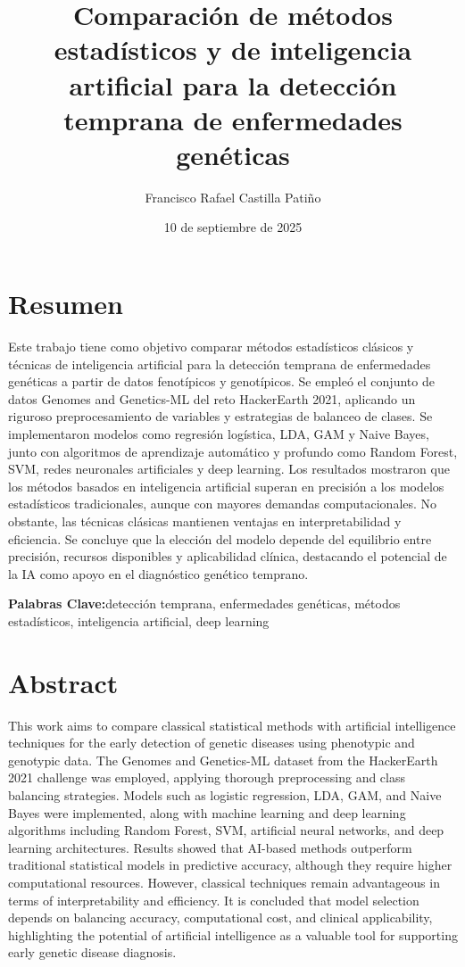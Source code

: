 \documentclass[11pt,a4paper,spanish]{book}
\title{Comparación de métodos estadísticos y de inteligencia artificial para la detección temprana de enfermedades genéticas}
\author{Francisco Rafael Castilla Patiño}
\date{10 de septiembre de 2025}
\numberwithin{equation}{chapter}
\numberwithin{figure}{chapter}
\begin{document}
\renewcommand{\listfigurename}{Índice de Ilustraciones}
\renewcommand{\listtablename}{Índice de Tablas}
\renewcommand{\contentsname}{Índice de Contenidos}
\renewcommand{\figurename}{Figura}
\renewcommand{\tablename}{Tabla} 

\maketitle

\frontmatter
\tableofcontents
\listoffigures
\listoftables

\chapter{Resumen}
Este trabajo tiene como objetivo comparar métodos estadísticos clásicos y técnicas de inteligencia artificial para la detección temprana de enfermedades genéticas a partir de datos fenotípicos y genotípicos. Se empleó el conjunto de datos Genomes and Genetics-ML del reto HackerEarth 2021, aplicando un riguroso preprocesamiento de variables y estrategias de balanceo de clases. Se implementaron modelos como regresión logística, LDA, GAM y Naive Bayes, junto con algoritmos de aprendizaje automático y profundo como Random Forest, SVM, redes neuronales artificiales y deep learning. Los resultados mostraron que los métodos basados en inteligencia artificial superan en precisión a los modelos estadísticos tradicionales, aunque con mayores demandas computacionales. No obstante, las técnicas clásicas mantienen ventajas en interpretabilidad y eficiencia. Se concluye que la elección del modelo depende del equilibrio entre precisión, recursos disponibles y aplicabilidad clínica, destacando el potencial de la IA como apoyo en el diagnóstico genético temprano.


{\bf Palabras Clave:}detección temprana, enfermedades genéticas, métodos estadísticos, inteligencia artificial, deep learning

\chapter{Abstract}
This work aims to compare classical statistical methods with artificial intelligence techniques for the early detection of genetic diseases using phenotypic and genotypic data. The Genomes and Genetics-ML dataset from the HackerEarth 2021 challenge was employed, applying thorough preprocessing and class balancing strategies. Models such as logistic regression, LDA, GAM, and Naive Bayes were implemented, along with machine learning and deep learning algorithms including Random Forest, SVM, artificial neural networks, and deep learning architectures. Results showed that AI-based methods outperform traditional statistical models in predictive accuracy, although they require higher computational resources. However, classical techniques remain advantageous in terms of interpretability and efficiency. It is concluded that model selection depends on balancing accuracy, computational cost, and clinical applicability, highlighting the potential of artificial intelligence as a valuable tool for supporting early genetic disease diagnosis.
\end{document}
